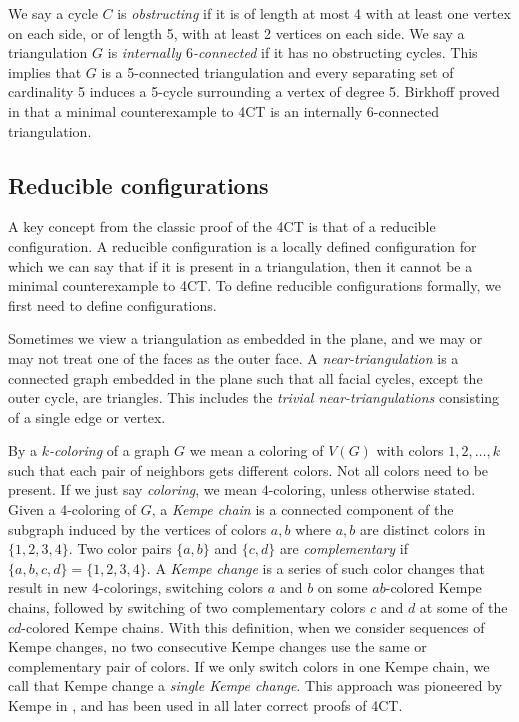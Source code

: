 \documentclass[10pt,a4paper]{article}
\begin{document}
We say a cycle $C$ is \emph{obstructing} if it is of length at most 4 with at least one vertex on each side, or of length 5, with at least 2 vertices on each side. 
We say a triangulation $G$ is \emph{internally $6$-connected} if it has no obstructing cycles.
This implies that $G$ is a 5-connected triangulation and every separating set of cardinality 5 induces a 5-cycle surrounding a vertex of degree 5. 
Birkhoff proved in \cite{birkhoff} that a minimal counterexample to 4CT is an internally $6$-connected triangulation. 





\subsection{Reducible configurations}
\label{sec:reducibility}

A key concept from the classic proof of the 4CT \cite{AppelHaken89,RSST} is that of a reducible configuration. A reducible configuration is a locally defined configuration for which we can say that if it is present in a triangulation, then it cannot be a minimal counterexample to 4CT.
To define reducible configurations formally, we first need to define configurations.

Sometimes we view a triangulation as embedded in the plane, and we may or may not treat one of the faces as the outer face. A \emph{near-triangulation} is a connected graph embedded in the plane such that all facial cycles, except the outer cycle, are triangles. This includes the \emph{trivial near-triangulations} consisting of a single edge or vertex.


By a \emph{$k$-coloring} of a graph $G$ we mean a coloring of $V(G)$ with colors
$1,2, \ldots, k$ such that each pair of neighbors gets different colors. Not all colors need to be present. If we just say \emph{coloring}, we mean $4$-coloring, unless otherwise stated.
Given a 4-coloring of $G$, a \emph{Kempe chain} is a 
connected component of the subgraph induced by the vertices of colors $a,b$ where $a,b$ are distinct colors in  $\{1,2,3,4\}$.
Two color pairs $\{a,b\}$ and $\{c,d\}$  are \emph{complementary} if $\{a,b,c,d\}=\{1,2,3,4\}$. A \emph{Kempe change} is a series of such color changes that result in new 4-colorings, switching colors $a$ and $b$ on some $ab$-colored Kempe chains, followed by switching of two complementary colors $c$ and $d$ at some of the $cd$-colored Kempe chains.  With this definition, when we consider sequences of Kempe changes, no two consecutive Kempe changes use the same or complementary pair of colors. If we only switch colors in one Kempe chain, we call that Kempe change a \emph{single Kempe change}. This approach was pioneered by Kempe in \cite{kempe1879}, and has been used in all later correct proofs of 4CT.
\end{document}
